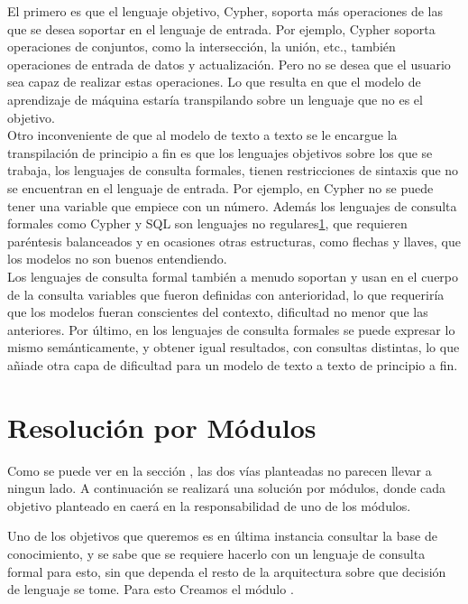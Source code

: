 El primero es que el lenguaje objetivo, Cypher, soporta m\'as operaciones de las que se desea soportar en el lenguaje de entrada. Por ejemplo, Cypher soporta operaciones de conjuntos, como la intersecci\'on, la uni\'on, etc., tambi\'en operaciones de entrada de datos y actualizaci\'on. Pero no se desea que el usuario sea capaz de realizar estas operaciones. Lo que resulta en que el modelo de aprendizaje de m\'aquina estar\'ia transpilando sobre un lenguaje que no es el objetivo.\\

Otro inconveniente de que al modelo de texto a texto se le encargue la transpilaci\'on de principio a fin es que los lenguajes objetivos sobre los que se trabaja, los lenguajes de consulta formales, tienen restricciones de sintaxis que no se encuentran en el lenguaje de entrada. Por ejemplo, en Cypher no se puede tener una variable que empiece con un n\'umero. Adem\'as los lenguajes de consulta formales como Cypher y SQL son lenguajes no regulares\ref{}, que requieren par\'entesis balanceados y en ocasiones otras estructuras, como flechas y llaves, que los modelos no son buenos entendiendo.\\

Los lenguajes de consulta formal tambi\'en a menudo soportan y usan en el cuerpo de la consulta variables que fueron definidas con anterioridad, lo que requerir\'ia que los modelos fueran conscientes del contexto, dificultad no menor que las anteriores. Por \'ultimo, en los lenguajes de consulta formales se puede expresar lo mismo sem\'anticamente, y obtener igual resultados, con consultas distintas, lo que a\~niade otra capa de dificultad para un modelo de texto a texto de principio a fin.\\


\section{Resoluci\'on por M\'odulos}
Como se puede ver en la secci\'on , las dos v\'ias planteadas no parecen llevar a ningun lado. A continuaci\'on se realizar\'a una soluci\'on por m\'odulos, donde cada objetivo planteado en  caer\'a en la responsabilidad de uno de los m\'odulos.

Uno de los objetivos que queremos es en \'ultima instancia consultar la base de conocimiento, y se sabe que se requiere hacerlo con un lenguaje de consulta formal para esto, sin que dependa el resto de la arquitectura sobre que decisi\'on de lenguaje se tome. Para esto Creamos el m\'odulo .\\

